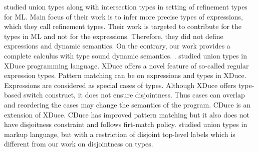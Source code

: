 
\citet{freeman1991refinement} studied union types along with intersection types
in setting of refinement types for ML. Main focus of their work is to infer
more precise types of expressions, which they call
refinement types. Their work is targeted to contribute for the types
in ML and not for the expressions. Therefore, they did not define
expressions and dynamic semantics. On the contrary, our work provides
a complete calculus with type sound dynamic semantics.
.
\citet{hosoya2003xduce} studied union types
in XDuce programming language. XDuce offers a novel feature of
so-called regular expression types. Pattern matching can be on
expressions and types in XDuce.  Expressions are considered as special
cases of types. Although XDuce offers type-based switch construct,
it does not ensure disjointness. Thus cases can overlap and
reordering the cases may change the semantics of the program. CDuce
\cite{benzaken2003cduce} is an extension of XDuce. CDuce has improved
pattern matching but it also does not have disjoitness constraint and
follows firt-match policy.  \citet{fallside2001xml} studied union
types in markup language, but with a restriction of disjoint top-level
labels which is different from our work on
disjointness on types.


